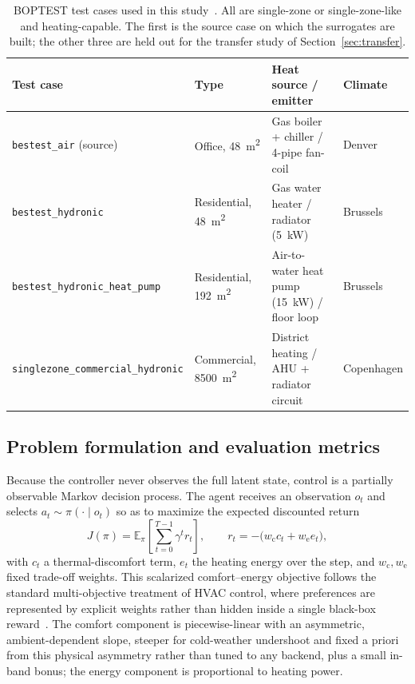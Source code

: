 \documentclass[energies,article,submit,moreauthors]{Definitions/mdpi}
\begin{document}
\begin{table}[H]
\centering
\small
\begin{tabularx}{\linewidth}{@{}llXl@{}}
\toprule
Test case & Type & Heat source / emitter & Climate \\
\midrule
\texttt{bestest\_air} (source) & Office, \SI{48}{\meter\squared} & Gas boiler + chiller / 4-pipe fan-coil & Denver \\
\texttt{bestest\_hydronic} & Residential, \SI{48}{\meter\squared} & Gas water heater / radiator (\SI{5}{\kilo\watt}) & Brussels \\
\texttt{bestest\_hydronic\_heat\_pump} & Residential, \SI{192}{\meter\squared} & Air-to-water heat pump (\SI{15}{\kilo\watt}) / floor loop & Brussels \\
\texttt{singlezone\_commercial\_hydronic} & Commercial, \SI{8500}{\meter\squared} & District heating / AHU + radiator circuit & Copenhagen \\
\bottomrule
\end{tabularx}
\caption{BOPTEST test cases used in this study~\cite{Blum2021BOPTEST}. All are single-zone or
single-zone-like and heating-capable. The first is the source case on which the surrogates are
built; the other three are held out for the transfer study of Section~\ref{sec:transfer}.}
\label{tab:testcases}
\end{table}

\subsection{Problem formulation and evaluation metrics}\label{ssec:pomdp}
Because the controller never observes the full latent state, control is a partially observable
Markov decision process. The agent receives an observation $o_t$ and selects
$a_t\sim\pi(\cdot\mid o_t)$ so as to maximize the expected discounted return~\cite{Sutton2018RL}
\begin{equation}
J(\pi)=\mathbb{E}_{\pi}\!\left[\sum_{t=0}^{T-1}\gamma^{t} r_t\right],
\qquad r_t=-\big(w_{\mathrm{c}} c_t + w_{\mathrm{e}} e_t\big),
\label{eq:return}
\end{equation}
with $c_t$ a thermal-discomfort term, $e_t$ the heating energy over the step, and
$w_{\mathrm{c}},w_{\mathrm{e}}$ fixed trade-off weights. This scalarized comfort--energy objective
follows the standard multi-objective treatment of HVAC control, where preferences are represented by
explicit weights rather than hidden inside a single black-box
reward~\cite{Roijers2013MOSurvey,Yang2019MORL,Hayes2022MOSurvey}. The comfort component is
piecewise-linear with an asymmetric, ambient-dependent slope, steeper for cold-weather undershoot
and fixed a priori from this physical asymmetry rather than tuned to any backend, plus a small
in-band bonus; the energy component is proportional to heating power.
\end{document}
